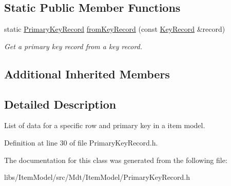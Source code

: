 \subsection*{Static Public Member Functions}
\begin{DoxyCompactItemize}
\item 
static \hyperlink{class_mdt_1_1_item_model_1_1_primary_key_record}{Primary\+Key\+Record} \hyperlink{class_mdt_1_1_item_model_1_1_primary_key_record_a13f14038d69559c5e6e59b12145a1c62}{from\+Key\+Record} (const \hyperlink{class_mdt_1_1_item_model_1_1_key_record}{Key\+Record} \&record)\hypertarget{class_mdt_1_1_item_model_1_1_primary_key_record_a13f14038d69559c5e6e59b12145a1c62}{}\label{class_mdt_1_1_item_model_1_1_primary_key_record_a13f14038d69559c5e6e59b12145a1c62}

\begin{DoxyCompactList}\small\item\em Get a primary key record from a key record. \end{DoxyCompactList}\end{DoxyCompactItemize}
\subsection*{Additional Inherited Members}


\subsection{Detailed Description}
List of data for a specific row and primary key in a item model. 

Definition at line 30 of file Primary\+Key\+Record.\+h.



The documentation for this class was generated from the following file\+:\begin{DoxyCompactItemize}
\item 
libs/\+Item\+Model/src/\+Mdt/\+Item\+Model/Primary\+Key\+Record.\+h\end{DoxyCompactItemize}
